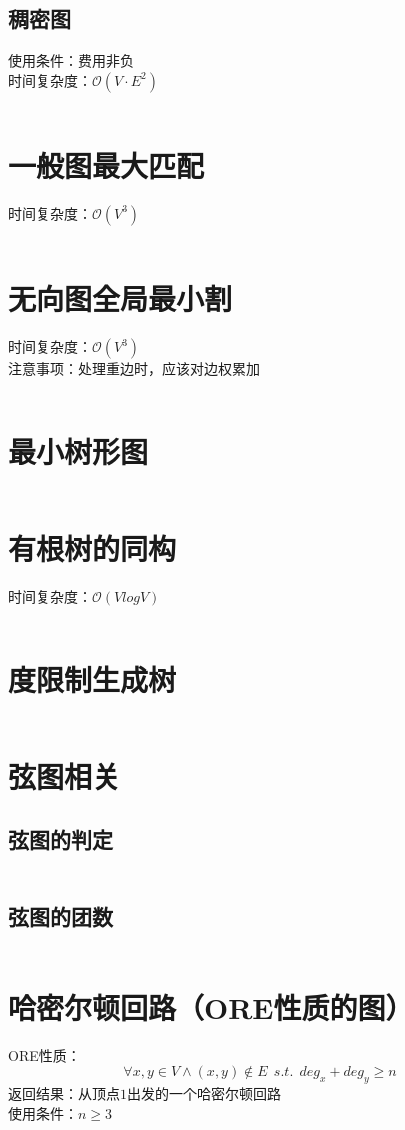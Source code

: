 \documentclass[a4paper,openany]{book}
\newcommand{\cppcode}[1]{
    \inputminted[mathescape,
    			 tabsize=4,
    			 linenos,
    			 frame=single,
    			 framesep=2mm,
    			 breakaftergroup=true,
    			 breakautoindent=true,
    			 breakbytoken=true,
    			 breaklines=true
    ]{cpp}{#1}
}
\begin{document}
\begin{spacing}{1.0}
		\subsection{稠密图}
			使用条件：费用非负\\
			\indent 时间复杂度：$\mathcal{O}(V \cdot E^2)$
			\cppcode{Source/Graph-Theory/Minimum-Cost-Flow-Zkw.cpp}
		\section{一般图最大匹配}
			时间复杂度：$\mathcal{O}(V^3)$
			\cppcode{Source/Graph-Theory/Maximum-Matching-Blossom.cpp}
		\section{无向图全局最小割}
			时间复杂度：$\mathcal{O}(V^3)$\\
			\indent 注意事项：处理重边时，应该对边权累加
			\cppcode{Source/Graph-Theory/Minimum-Cut-Stoer-Wagner.cpp}
		\section{最小树形图}
			\cppcode{Source/Graph-Theory/Chu-Liu-Algorithm.cpp}
		\section{有根树的同构}
			时间复杂度：$\mathcal{O}(V log V)$
			\cppcode{Source/Graph-Theory/Rooted-Tree-Isomorphism.cpp}
		\section{度限制生成树}
			\cppcode{Source/Graph-Theory/Minimum-Spanning-Tree-With-Degree-Limit.cpp}
		\section{弦图相关}
			\subsection{弦图的判定}
				\cppcode{Source/Graph-Theory/Chord-Graph-Judgement.cpp}
			\subsection{弦图的团数}
				\cppcode{Source/Graph-Theory/Chord-Graph-Group-Counter.cpp}
		\section{哈密尔顿回路（ORE性质的图）}
			ORE性质：$$\forall x,y \in V \wedge (x,y) \notin E \ \ s.t. \ \ deg_x+deg_y \geq n$$
			\indent 返回结果：从顶点$1$出发的一个哈密尔顿回路\\
			\indent 使用条件：$n \geq 3$
			\cppcode{Source/Graph-Theory/Hamiltonian-Circuit-Ore.cpp}

\end{spacing}
\end{document}
